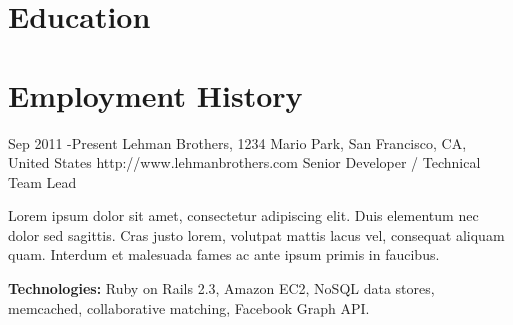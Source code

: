 \documentclass[10pt]{article} %
\begin{document}

\section{Education}





\section{Employment History}

\job
{Sep 2011 -}{Present}
{Lehman Brothers, 1234 Mario Park, San Francisco, CA, United States}
{http://www.lehmanbrothers.com}
{Senior Developer / Technical Team Lead}
{Lorem ipsum dolor sit amet, consectetur adipiscing elit. Duis elementum nec dolor sed sagittis. Cras justo lorem, volutpat mattis lacus vel, consequat aliquam quam. Interdum et malesuada fames ac ante ipsum primis in faucibus.\\
    \rule{0mm}{5mm}\textbf{Technologies:} Ruby on Rails 2.3, Amazon EC2, NoSQL data stores, memcached, collaborative matching, Facebook Graph API.}

\end{document}

